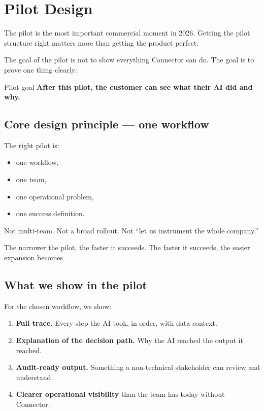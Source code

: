\chapter{Pilot Design}

The pilot is the most important commercial moment in 2026.
Getting the pilot structure right matters more than getting the product perfect.

The goal of the pilot is not to show everything Connector can do.
The goal is to prove one thing clearly:

\begin{conceptbox}{Pilot goal}
\centering
\large\bfseries After this pilot, the customer can see what their AI did and why.
\end{conceptbox}

\section{Core design principle --- one workflow}

The right pilot is:

\begin{itemize}
  \item one workflow,
  \item one team,
  \item one operational problem,
  \item one success definition.
\end{itemize}

Not multi-team.
Not a broad rollout.
Not ``let us instrument the whole company.''

The narrower the pilot, the faster it succeeds.
The faster it succeeds, the easier expansion becomes.

\section{What we show in the pilot}

For the chosen workflow, we show:

\begin{enumerate}
  \item \textbf{Full trace.} Every step the AI took, in order, with data context.
  \item \textbf{Explanation of the decision path.} Why the AI reached the output it reached.
  \item \textbf{Audit-ready output.} Something a non-technical stakeholder can review and understand.
  \item \textbf{Clearer operational visibility} than the team has today without Connector.
\end{enumerate}

